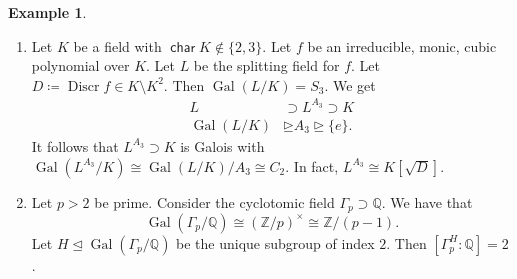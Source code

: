 \documentclass[10pt,letterpaper,cm]{nupset}
\theoremstyle{definition}
\newtheorem{exmp}[definition]{Example}
\theoremstyle{theorem}
\theoremstyle{remark}
\newcommand{\Q}{\mathbb Q}
\newcommand{\Z}{\mathbb Z}
\newcommand{\1}{\mathbf{1}}
\newcommand{\0}{\vec 0}
\DeclareMathOperator{\Char}{\mathsf{char}}
\DeclareMathOperator{\gal}{Gal}
\DeclareMathOperator{\disc}{Discr}
\begin{document}
\begin{exmp} $ $
\begin{enumerate}
\item Let $K$ be a field with $\Char{K} \notin \{2,3\}$. Let $f$ be an irreducible, monic, cubic polynomial over $K$. Let $L$ be the splitting field for $f$. Let $D\coloneqq  \disc{f} \in K \setminus K^2$. Then $\gal(L/K) = S_3$. We get
\begin{align*} L & \supset L^{A_3} \supset K  \\   \gal(L/K)  & \unrhd A_3 \unrhd \{e\}  . \end{align*} It follows that $L^{A_3}\supset K$ is Galois with $\gal(L^{A_3}/K) \cong \gal(L/K)/A_3 \cong C_2$. In fact, $L^{A_3} \cong K[\sqrt{D}]$.
\item Let $p>2$ be prime. Consider the cyclotomic field $\Gamma_p \supset \Q$. We have that $$   \gal(\Gamma_p/\Q) \cong (\Z/p)^{\times} \cong \Z/(p-1) .$$ Let $H \unlhd \gal(\Gamma_p/\Q)$ be the unique subgroup of index $2$. Then $[\Gamma_p^H :\Q] =2$.


\end{enumerate}
\end{exmp}
\end{document}
